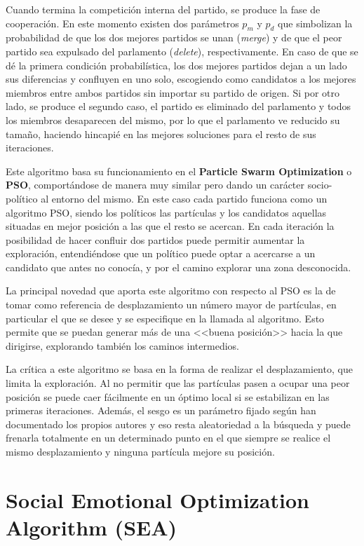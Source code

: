 Cuando termina la competición interna del partido, se produce la fase de cooperación. En este momento existen dos parámetros $p_m$ y $p_d$ que simbolizan la probabilidad de que los dos mejores partidos se unan (\textit{merge}) y de que el peor partido sea expulsado del parlamento (\textit{delete}), respectivamente. En caso de que se dé la primera condición probabilística, los dos mejores partidos dejan a un lado sus diferencias y confluyen en uno solo, escogiendo como candidatos a los mejores miembros entre ambos partidos sin importar su partido de origen. Si por otro lado, se produce el segundo caso, el partido es eliminado del parlamento y todos los miembros desaparecen del mismo, por lo que el parlamento ve reducido su tamaño, haciendo hincapié en las mejores soluciones para el resto de sus iteraciones.

Este algoritmo basa su funcionamiento en el \textbf{Particle Swarm Optimization} o \textbf{PSO}, comportándose de manera muy similar pero dando un carácter socio-político al entorno del mismo. En este caso cada partido funciona como un algoritmo PSO, siendo los políticos las partículas y los candidatos aquellas situadas en mejor posición a las que el resto se acercan. En cada iteración la posibilidad de hacer confluir dos partidos puede permitir aumentar la exploración, entendiéndose que un político puede optar a acercarse a un candidato que antes no conocía, y por el camino explorar una zona desconocida.

La principal novedad que aporta este algoritmo con respecto al PSO es la de tomar como referencia de desplazamiento un número mayor de partículas, en particular el que se desee y se especifique en la llamada al algoritmo. Esto permite que se puedan generar más de una <<buena posición>> hacia la que dirigirse, explorando también los caminos intermedios.

La crítica a este algoritmo se basa en la forma de realizar el desplazamiento, que limita la exploración. Al no permitir que las partículas pasen a ocupar una peor posición se puede caer fácilmente en un óptimo local si se estabilizan en las primeras iteraciones. Además, el sesgo es un parámetro fijado según han documentado los propios autores \cite{poa-article} y eso resta aleatoriedad a la búsqueda y puede frenarla totalmente en un determinado punto en el que siempre se realice el mismo desplazamiento y ninguna partícula mejore su posición.

\section{Social Emotional Optimization Algorithm (SEA)}

